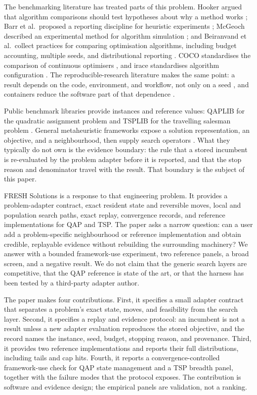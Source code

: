 \documentclass[10pt]{article}
\begin{document}
The benchmarking literature has treated parts of this problem. Hooker argued that algorithm
comparisons should test hypotheses about why a method works \citep{hooker1995}; Barr et al.\ proposed
a reporting discipline for heuristic experiments \citep{barr1995}; McGeoch described an experimental
method for algorithm simulation \citep{mcgeoch1996}; and Beiranvand et al.\ collect practices for
comparing optimisation algorithms, including budget accounting, multiple seeds, and distributional
reporting \citep{beiranvand2017,bartz2020}. COCO standardises the comparison of continuous optimisers
\citep{hansen2020}, and irace standardises algorithm configuration \citep{lopez2016}. The
reproducible-research literature makes the same point: a result depends on the code, environment,
and workflow, not only on a seed \citep{peng2011,sandve2013,wilson2014,stodden2016,donoho2009}, and
containers reduce the software part of that dependence \citep{boettiger2015,kurtzer2017}.

Public benchmark libraries provide instances and reference values: QAPLIB for the quadratic
assignment problem \citep{burkard1997} and TSPLIB for the travelling salesman problem
\citep{reinelt1991}. General metaheuristic frameworks expose a solution representation, an objective,
and a neighbourhood, then supply search operators \citep{blum2003,hoos2004}. What they typically do
not own is the evidence boundary: the rule that a stored incumbent is re-evaluated by the problem
adapter before it is reported, and that the stop reason and denominator travel with the result. That
boundary is the subject of this paper.

FRESH Solutions is a response to that engineering problem. It provides a problem-adapter contract,
exact resident state and reversible moves, local and population search paths, exact replay,
convergence records, and reference implementations for QAP and TSP. The paper asks a narrow
question: can a user add a problem-specific neighbourhood or reference implementation and obtain
credible, replayable evidence without rebuilding the surrounding machinery? We answer with a bounded
framework-use experiment, two reference panels, a broad screen, and a negative result. We do not
claim that the generic search layers are competitive, that the QAP reference is state of the art, or
that the harness has been tested by a third-party adapter author.

The paper makes four contributions. First, it specifies a small adapter contract that separates a
problem's exact state, moves, and feasibility from the search layer. Second, it specifies a replay
and evidence protocol: an incumbent is not a result unless a new adapter evaluation reproduces the
stored objective, and the record names the instance, seed, budget, stopping reason, and provenance.
Third, it provides two reference implementations and reports their full distributions, including
tails and cap hits. Fourth, it reports a convergence-controlled framework-use check for QAP state
management and a TSP breadth panel, together with the failure modes that the protocol exposes. The
contribution is software and evidence design; the empirical panels are validation, not a ranking.
\end{document}
